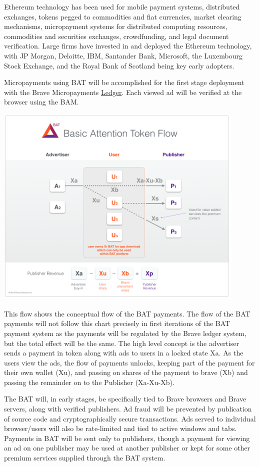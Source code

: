 \documentclass[11pt]{article}
\begin{document}
Ethereum technology has been used for mobile payment systems, distributed exchanges, tokens pegged to commodities and fiat currencies, market clearing mechanisms, micropayment systems for distributed computing resources, commodities and securities exchanges, crowdfunding, and legal document verification. Large firms have invested in and deployed the Ethereum technology, with JP Morgan, Deloitte, IBM, Santander Bank, Microsoft, the Luxembourg Stock Exchange, and the Royal Bank of Scotland being key early adopters.

Micropayments using BAT will be accomplished for the first stage deployment with the Brave Micropayments \href{https://github.com/brave/ledger}{Ledger}. Each viewed ad will be verified at the browser using the BAM. 

\begin{center}
\includegraphics[width=0.9\textwidth]{BAT_tokentech_diagram.png}
\end{center}

This flow shows the conceptual flow of the BAT payments. The flow of the BAT payments will not follow this chart precisely in first iterations of the BAT payment system as the payments will be regulated by the Brave ledger system, but the total effect will be the same. The high level concept is the advertiser sends a payment in token along with ads to users in a locked state Xa. As the users view the ads, the flow of payments unlocks, keeping part of the payment for their own wallet (Xu), and passing on shares of the payment to brave (Xb) and passing the remainder on to the Publisher (Xa-Xu-Xb).  

The BAT will, in early stages, be specifically tied to Brave browsers and Brave servers, along with verified publishers. Ad fraud will be prevented by publication of source code and cryptographically secure transactions. Ads served to individual browser/users will also be rate-limited and tied to active windows and tabs. Payments in BAT will be sent only to publishers, though a payment for viewing an ad on one publisher may be used at another publisher or kept for some other premium services supplied through the BAT system.
\end{document}
